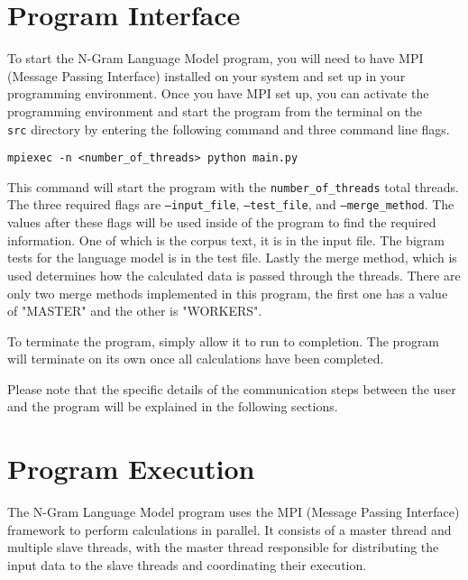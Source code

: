 \documentclass[12pt, A4, titlepage]{article}
\begin{document}
\section{Program Interface}

To start the N-Gram Language Model program, you will need to have MPI (Message Passing Interface) installed on your system and set up in your programming environment. Once you have MPI set up, you can activate the programming environment and start the program from the terminal on the \texttt{\\src} directory by entering the following command and three command line flags. 

\begin{verbatim}
mpiexec -n <number_of_threads> python main.py 
\end{verbatim}

This command will start the program with the \texttt{number\_of\_threads} total threads. The three required flags are \texttt{--input\_file}, \texttt{--test\_file}, and \texttt{--merge\_method}. The values after these flags will be used inside of the program to find the required information. One of which is the corpus text, it is in the input file. The bigram tests for the language model is in the test file. Lastly the merge method, which is used  determines how the calculated data is passed through the threads. There are only two merge methods implemented in this program, the first one has a value of "MASTER" and the other is "WORKERS". 

To terminate the program, simply allow it to run to completion. The program will terminate on its own once all calculations have been completed. 

Please note that the specific details of the communication steps between the user and the program will be explained in the following sections.

\section{Program Execution}

The N-Gram Language Model program uses the MPI (Message Passing Interface) framework to perform calculations in parallel. It consists of a master thread and multiple slave threads, with the master thread responsible for distributing the input data to the slave threads and coordinating their execution.
\end{document}
